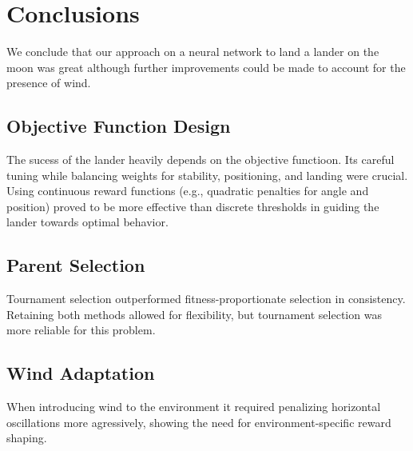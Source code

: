 \documentclass{article}
\begin{document}
\section{Conclusions}

We conclude that our approach on a neural network to land a lander on the moon was great although further improvements could be made to account for the presence of wind.


\subsection{Objective Function Design}

The sucess of the lander heavily depends on the objective functioon. Its careful tuning while balancing weights for stability, positioning, and landing were crucial.
Using continuous reward functions (e.g., quadratic penalties for angle and position) proved to be more effective than discrete thresholds in guiding the lander towards optimal behavior.

\subsection{Parent Selection}
Tournament selection outperformed fitness-proportionate selection in consistency. Retaining both methods allowed for flexibility, but tournament selection was more reliable for this problem.

\subsection{Wind Adaptation}
When introducing wind to the environment it required penalizing horizontal oscillations more agressively, showing the need for environment-specific reward shaping.
\end{document}
